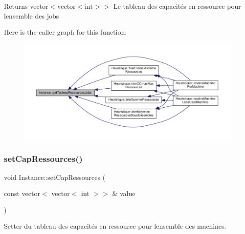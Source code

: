 \begin{DoxyReturn}{Returns}
vector$<$vector$<$int$>$$>$ Le tableau des capacités en ressource pour l\textquotesingle{}ensemble des jobs 
\end{DoxyReturn}
Here is the caller graph for this function\+:\nopagebreak
\begin{figure}[H]
\begin{center}
\leavevmode
\includegraphics[width=350pt]{classInstance_a98460018fa91a213ce7c1fe83a318641_icgraph}
\end{center}
\end{figure}
\mbox{\label{classInstance_a57f113b9723182ba7f8f5346b34095eb}} 
\subsubsection{\texorpdfstring{set\+Cap\+Ressources()}{setCapRessources()}}
{\footnotesize\ttfamily void Instance\+::set\+Cap\+Ressources (\begin{DoxyParamCaption}\item[{const vector$<$ vector$<$ int $>$$>$ \&}]{value }\end{DoxyParamCaption})}



Setter du tableau des capacités en ressource pour l\textquotesingle{}ensemble des machines. 


